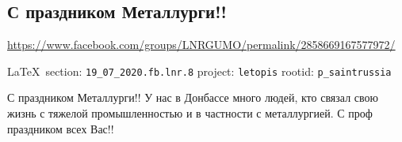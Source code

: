 
 
\subsection{С праздником Металлурги!!}
\label{sec:19_07_2020.fb.lnr.8}
\url{https://www.facebook.com/groups/LNRGUMO/permalink/2858669167577972/}
  
\vspace{0.5cm}
{\small\LaTeX~section: \verb|19_07_2020.fb.lnr.8| project: \verb|letopis| rootid: \verb|p_saintrussia|}
\vspace{0.5cm}

С праздником Металлурги!! У нас в Донбассе много людей, кто связал свою жизнь
с тяжелой промышленностью и в частности с металлургией. С проф праздником всех
Вас!!  


